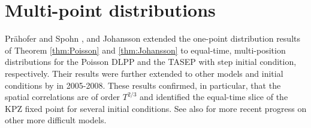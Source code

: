 \documentclass[10pt]{article}
\theoremstyle{plain}
\theoremstyle{definition}
\numberwithin{equation}{section}
\begin{document}


\section{Multi-point distributions}\label{sec:multitime}


Pr\"ahofer and Spohn \cite{Prahofer-Spohn02}, and Johansson \cite{Johansson03} extended the one-point distribution results of Theorem \ref{thm:Poisson} and \ref{thm:Johansson} to equal-time, multi-position distributions for  the Poisson DLPP and the TASEP with step initial condition, respectively. 
Their results were further extended to other models and initial conditions by \cite{Sasamoto05, Borodin-Ferrari-Prahofer-Sasamoto07, Borodin-Ferrari-Sasamoto08, Borodin-Ferrari-Sasamoto08a} in 2005-2008.  
These results confirmed, in particular, that the spatial correlations are of order $T^{2/3}$ and identified the equal-time slice of the KPZ fixed point for several initial conditions. 
See also \cite{Dimitrov20} for more recent progress on other more difficult models. 



\end{document}
